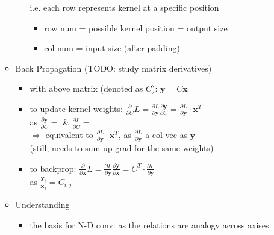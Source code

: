 \begin{itemize}
\begin{itemize}
\begin{itemize}
		i.e. each row represents kernel at a specific position
			\begin{itemize}
			\item row num = possible kernel position = output size
			\item col num = input size (after padding)
			\end{itemize}
		\end{itemize}
	\item Back Propagation (TODO: study matrix derivatives)
		\begin{itemize}
		\item with above matrix (denoted as $C$): $\mathbf y = C \mathbf x$
		\item to update kernel weights: $\frac{\partial}{\partial C} L = \frac{\partial L}{\partial\mathbf y} \frac{\partial\mathbf y}{\partial C} =\frac{\partial L}{\partial\mathbf y} \cdot \mathbf x^T$\\
		as $\frac{\partial\mathbf y}{\partial C} =$ \&
		$\frac{\partial L}{\partial C} =$ \\
		$\Rightarrow$ equivalent to $\frac{\partial L}{\partial\mathbf y} \cdot \mathbf x^T$, as $\frac{\partial L}{\partial\mathbf y}$ a col vec as $\mathbf y$ \\
		(still, needs to sum up grad for the same weights)
		\item to backprop: $\frac{\partial}{\partial \mathbf x} L = \frac{\partial L}{\partial \mathbf y} \frac{\partial \mathbf y}{\partial \mathbf x} = C^T \cdot \frac{\partial L}{\partial \mathbf y}$ \\
		as $\frac{\mathbf y_i}{\mathbf x_j} = C_{i,j}$
		\end{itemize}
	\item Understanding
		\begin{itemize}
		\item the basis for N-D conv: as the relations are analogy across axises

\end{itemize}
\end{itemize}
\end{itemize}
